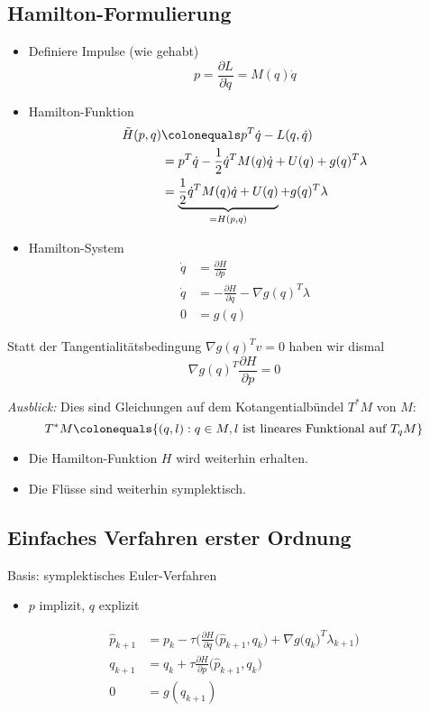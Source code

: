 \subsection*{Hamilton-Formulierung}
\begin{itemize}
\item Definiere Impulse (wie gehabt)
\begin{equation*}
p = \frac{\partial L}{\partial \dot{q}} = M(q) \dot{q}
\end{equation*}
\item Hamilton-Funktion
\begin{align*}
\tilde H(p,q) & \colonequals  p^T \dot{q} - L(q,\dot{q})
\\
& = p^T \dot{q} - \frac{1}{2} \dot{q}^T M(q) \dot{q} + U(q) + g(q)^T \lambda
\\
& = \underbrace{\frac{1}{2} \dot{q}^T M(q) \dot{q} + U(q)}_{= H (p,q)} + g(q)^T \lambda
\end{align*}
\item Hamilton-System
\begin{align*}
\dot{q} & = \frac{\partial H}{\partial p}
\\
\dot{q} & = - \frac{\partial H}{\partial q} - \nabla g(q)^T \lambda
\\
0 & = g(q)
\end{align*}
\end{itemize}

Statt der Tangentialitätsbedingung $\nabla g(q)^T v = 0$ haben wir dismal
\begin{equation*}
\nabla g(q)^T \frac{\partial H}{\partial p} = 0
\end{equation*}

\emph{Ausblick:} Dies sind Gleichungen auf dem Kotangentialbündel $T^*M$ von $M$:
\begin{equation*}
T^*M \colonequals \{ (q,l) : q \in M, l \text{ ist lineares Funktional auf } T_qM\}
\end{equation*}

\begin{itemize}
\item Die Hamilton-Funktion $H$ wird weiterhin erhalten.
\item Die Flüsse sind weiterhin symplektisch.
\end{itemize}

\subsection*{Einfaches Verfahren erster Ordnung}
Basis: symplektisches Euler-Verfahren
\begin{itemize}
\item $p$ implizit, $q$ explizit
\end{itemize}
\begin{align*}
\hat p_{k+1} & = p_k - \tau \Bigg( \frac{\partial H}{\partial q} \Big( \hat p_{k+1}, q_k\Big) + \nabla g\big(q_k\big)^T \lambda_{k+1}\Bigg)
\\
q_{k+1} & = q_k + \tau \frac{\partial H}{\partial p} \Big(\hat p_{k+1}, q_k\Big)
\\
0 & = g(q_{k+1})
\end{align*}

